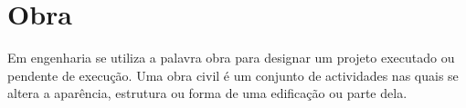 \chapter{Obra}
Em engenharia se utiliza a palavra obra para designar um projeto executado ou pendente de execução. Uma obra civil é um conjunto de actividades nas quais se altera a aparência, estrutura ou forma de uma edificação ou parte dela. \cite{WIKIO}